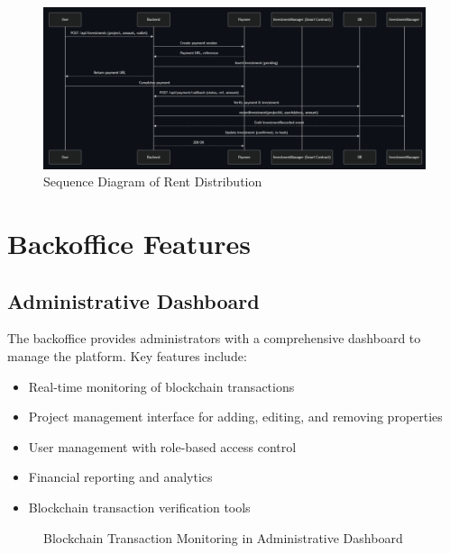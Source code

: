 \begin{figure}[htbp]
  \centering
  \includegraphics[width=\textwidth]{images/rent_distribution_sequence.png}
  \caption{Sequence Diagram of Rent Distribution}
  \label{fig:rent-distribution-sequence}
\end{figure}

\section{Backoffice Features}

\subsection{Administrative Dashboard}

The backoffice provides administrators with a comprehensive dashboard to manage the platform. Key features include:

\begin{itemize}
    \item Real-time monitoring of blockchain transactions
    \item Project management interface for adding, editing, and removing properties
    \item User management with role-based access control \cite{Botha2021BackofficeBlockchain}
    \item Financial reporting and analytics
    \item Blockchain transaction verification tools
\end{itemize}

\begin{figure}[htbp]
  \centering
  \caption{Blockchain Transaction Monitoring in Administrative Dashboard}
  \label{fig:admin-dashboard}
\end{figure}

